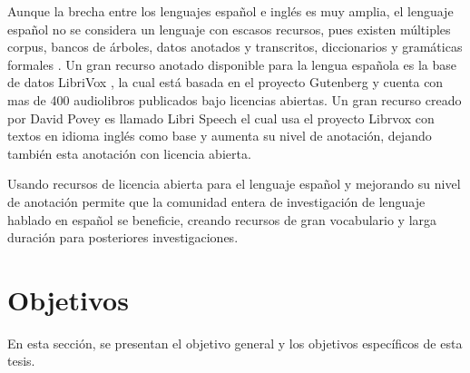 Aunque la brecha entre los lenguajes español e inglés es muy amplia, el lenguaje español no se considera un lenguaje con escasos recursos, pues existen múltiples corpus, bancos de árboles, datos anotados y transcritos, diccionarios y gramáticas formales \cite{CavarGlobalGORILLA}. Un gran recurso anotado disponible para la lengua española es la base de datos LibriVox  \cite{LibriVox}, la cual está basada en el proyecto Gutenberg \cite{gutenberg} y cuenta con mas de 400 audiolibros publicados bajo licencias abiertas. Un gran recurso creado por David Povey es llamado Libri Speech \cite{PanayotovLIBRISPEECH:BOOKS} el cual usa el proyecto Librvox con textos en idioma inglés como base y aumenta su nivel de anotación, dejando también esta anotación con licencia abierta.

Usando recursos de licencia abierta para el lenguaje español y mejorando su nivel de anotación permite que la comunidad entera de investigación de lenguaje hablado en español se beneficie, creando recursos de gran vocabulario y larga duración para posteriores investigaciones.

\section{Objetivos}

En esta sección, se presentan el objetivo general y los objetivos específicos de esta tesis.

